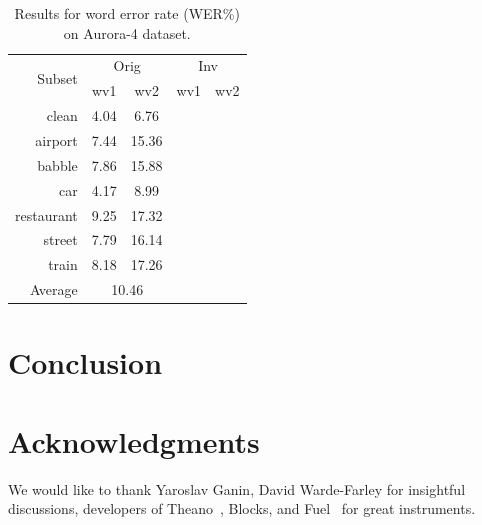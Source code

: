 \documentclass{article}
\begin{document}
\begin{table}
    \centering
    \caption{Results for word error rate (WER\%) on Aurora-4 dataset.}
    \label{tab:results}
    \begin{tabular}{r|cc|cc}
    \multirow{2}{*}{Subset} & \multicolumn{2}{c}{Orig}  & \multicolumn{2}{|c}{Inv}\\ 
               & wv1  & wv2  & wv1  & wv2 \\
    \hline 
    clean      & 4.04 & 6.76 & & \\
    airport    & 7.44 & 15.36& & \\
    babble     & 7.86 & 15.88& & \\
    car        & 4.17 & 8.99 & & \\
    restaurant & 9.25 & 17.32& & \\
    street     & 7.79 & 16.14& & \\
    train      & 8.18 & 17.26& & \\
    \hline
    Average    & \multicolumn{2}{c}{10.46}& & 
    \end{tabular}
\end{table}

\section{Conclusion}


\section*{Acknowledgments}

We would like to thank Yaroslav Ganin, David Warde-Farley for insightful discussions,
developers of Theano~\cite{2016arXiv160502688short}, Blocks, and Fuel~\cite{MerrienboerBDSW15} 
for great instruments.



\end{document}
